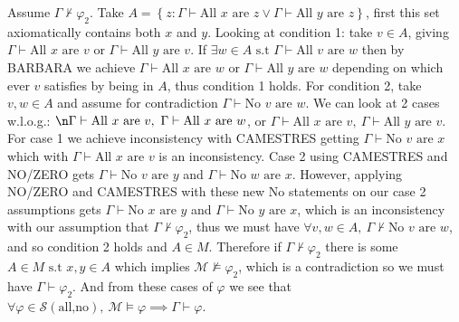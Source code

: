 \begin{enumerate}[(a)]
\begin{enumerate}[1.]
		Assume $\Gamma \nvdash  \varphi_2$. Take $A = \left\{  z: \Gamma \vdash  \text{All } x \text{ are } z \lor \Gamma \vdash  \text{All } y \text{ are } z  \right\} $, first this set axiomatically contains both $x$ and $y$. Looking at condition 1: take $v \in  A$, giving $\Gamma \vdash  \text{All } x \text{ are } v \text{ or } \Gamma \vdash  \text{All } y \text{ are } v $. If $\exists w \in  A \text{ s.t }  \Gamma \vdash  \text{All } v \text{ are } w $ then by BARBARA we achieve $\Gamma \vdash  \text{All } x \text{ are } w \text{ or } \Gamma \vdash  \text{All } y \text{ are } w $ depending on which ever $v$ satisfies by being in $A$, thus condition 1 holds. For condition 2, take $v,w \in  A$ and assume for contradiction $\Gamma \vdash  \text{No } v \text{ are } w $. We can look at 2 cases w.l.o.g.: $\n \Gamma \vdash  \text{All } x \text{ are } v ,\ \Gamma \vdash  \text{All } x \text{ are } w $, or $\Gamma \vdash  \text{All } x \text{ are } v ,\ \Gamma \vdash  \text{All } y \text{ are } v $. For case 1 we achieve inconsistency with CAMESTRES getting $\Gamma \vdash  \text{No } v \text{ are } x $ which with $\Gamma \vdash  \text{All } x \text{ are } v $ is an inconsistency. Case 2 using CAMESTRES and NO/ZERO gets $\Gamma \vdash  \text{No } v \text{ are } y $ and $\Gamma \vdash  \text{No } w \text{ are } x $. However, applying NO/ZERO and CAMESTRES with these new No statements on our case 2 assumptions gets $\Gamma \vdash  \text{No } x \text{ are } y $ and $\Gamma \vdash  \text{No } y \text{ are } x $, which is an inconsistency with our assumption that $\Gamma \nvdash  \varphi_2$, thus we must have $\forall v,w \in  A,\  \Gamma \nvdash  \text{No } v \text{ are } w $, and so condition 2 holds and $A \in  M$. Therefore if $\Gamma \nvdash  \varphi_2$ there is some $A \in  M \text{ s.t }  x,y \in  A$ which implies $\mathcal{M} \nvDash  \varphi_2$, which is a contradiction so we must have $\Gamma \vdash  \varphi_2$. And from these cases of $\varphi $ we see that $\forall \varphi \in  \mathscr{S}(\text{all,no}),\ \mathcal{M} \vDash  \varphi \implies  \Gamma \vdash  \varphi$. 
\end{enumerate}
\end{enumerate}

